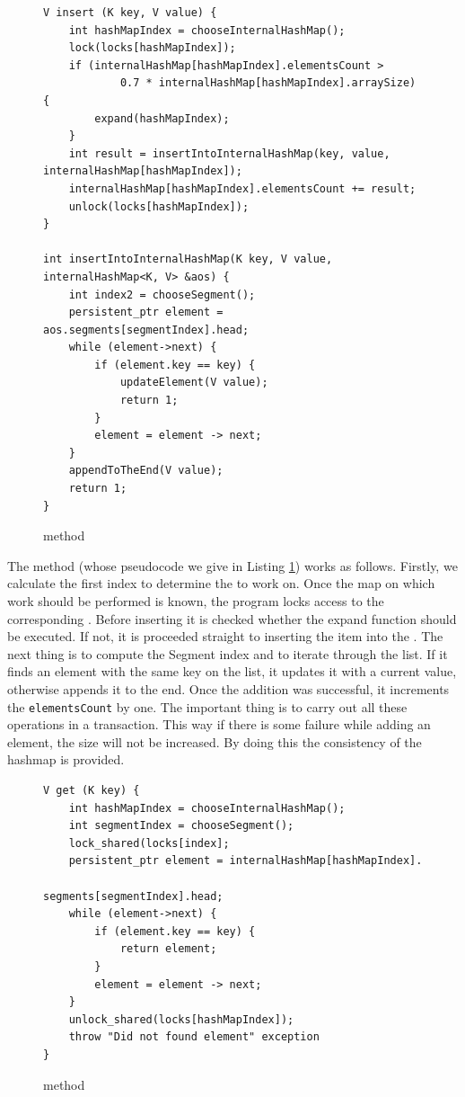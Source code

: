 \begin{figure}[ht]
\renewcommand{\figurename}{Listing}
\begin{lstlisting}
V insert (K key, V value) {
    int hashMapIndex = chooseInternalHashMap();
    lock(locks[hashMapIndex]);
    if (internalHashMap[hashMapIndex].elementsCount > 
            0.7 * internalHashMap[hashMapIndex].arraySize) {
        expand(hashMapIndex);
    }
    int result = insertIntoInternalHashMap(key, value, internalHashMap[hashMapIndex]);
    internalHashMap[hashMapIndex].elementsCount += result;
    unlock(locks[hashMapIndex]);
}
    
int insertIntoInternalHashMap(K key, V value, internalHashMap<K, V> &aos) {
    int index2 = chooseSegment();
    persistent_ptr element = aos.segments[segmentIndex].head;
    while (element->next) {
        if (element.key == key) {
            updateElement(V value);
            return 1;
        } 
        element = element -> next;
    }
    appendToTheEnd(V value);
    return 1;
}
\end{lstlisting}
\renewcommand{\figurename}{Listing}
\caption{\insertMethod method}
\label{insertMethod}
\end{figure}
        The \insertMethod method (whose pseudocode we give in Listing \ref{insertMethod}) works as follows.
        Firstly, we calculate the first index to determine the \internalHashMap to work on.  
        Once the map on which work should be performed is known, the program locks access to the corresponding \internalHashMap. 
        Before inserting it is checked whether the expand function should be executed. 
        If not, it is proceeded straight to inserting the item into the \internalHashMap. 
        The next thing is to compute the Segment index and to iterate through the list. 
        If it finds an element with the same key on the list, it updates it with a current value, otherwise appends it to the end.
        Once the addition was successful, it increments the \texttt{elementsCount} by one. 
        The important thing is to carry out all these operations in a transaction. 
        This way if there is some failure while adding an element, the size will not be increased. 
        By doing this the consistency of the hashmap is provided.
        
\begin{figure}[ht]
\renewcommand{\figurename}{Listing}
\begin{lstlisting}
V get (K key) {
    int hashMapIndex = chooseInternalHashMap();
    int segmentIndex = chooseSegment();
    lock_shared(locks[index];
    persistent_ptr element = internalHashMap[hashMapIndex].
                                    segments[segmentIndex].head;
    while (element->next) {
        if (element.key == key) {
            return element;
        }
        element = element -> next;
    }
    unlock_shared(locks[hashMapIndex]);
    throw "Did not found element" exception
}
\end{lstlisting}
\caption{\getMethod method}
\label{getMethod}
\end{figure}

